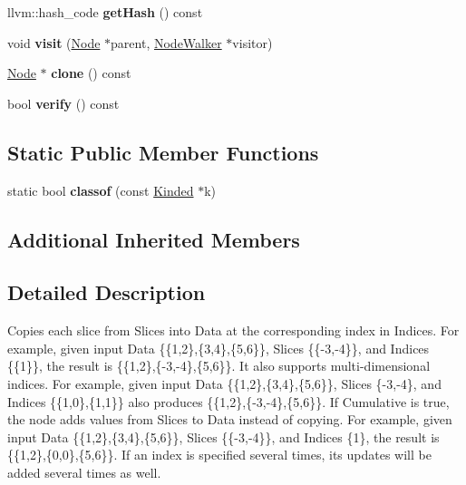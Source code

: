 \begin{DoxyCompactItemize}
\mbox{\label{classglow_1_1_scatter_data_node_a3f280cf9ec3d65c3fc680019aada2f54}} 
llvm\+::hash\+\_\+code {\bfseries get\+Hash} () const
\item 
\mbox{\label{classglow_1_1_scatter_data_node_afff14ebe54ce31d4155625d6c8e957dc}} 
void {\bfseries visit} (\hyperlink{classglow_1_1_node}{Node} $\ast$parent, \hyperlink{classglow_1_1_node_walker}{Node\+Walker} $\ast$visitor)
\item 
\mbox{\label{classglow_1_1_scatter_data_node_aff8761c16e5e69887ce9468ad8a1311f}} 
\hyperlink{classglow_1_1_node}{Node} $\ast$ {\bfseries clone} () const
\item 
\mbox{\label{classglow_1_1_scatter_data_node_a83de3d02d1f79bd9dba936229c31d571}} 
bool {\bfseries verify} () const
\end{DoxyCompactItemize}
\subsection*{Static Public Member Functions}
\begin{DoxyCompactItemize}
\item 
\mbox{\label{classglow_1_1_scatter_data_node_a564e0a5bd8f78aea83460a2a53962c35}} 
static bool {\bfseries classof} (const \hyperlink{classglow_1_1_kinded}{Kinded} $\ast$k)
\end{DoxyCompactItemize}
\subsection*{Additional Inherited Members}


\subsection{Detailed Description}
Copies each slice from Slices into Data at the corresponding index in Indices. For example, given input Data \{\{1,2\},\{3,4\},\{5,6\}\}, Slices \{\{-\/3,-\/4\}\}, and Indices \{\{1\}\}, the result is \{\{1,2\},\{-\/3,-\/4\},\{5,6\}\}. It also supports multi-\/dimensional indices. For example, given input Data \{\{1,2\},\{3,4\},\{5,6\}\}, Slices \{-\/3,-\/4\}, and Indices \{\{1,0\},\{1,1\}\} also produces \{\{1,2\},\{-\/3,-\/4\},\{5,6\}\}. If Cumulative is true, the node adds values from Slices to Data instead of copying. For example, given input Data \{\{1,2\},\{3,4\},\{5,6\}\}, Slices \{\{-\/3,-\/4\}\}, and Indices \{1\}, the result is \{\{1,2\},\{0,0\},\{5,6\}\}. If an index is specified several times, its updates will be added several times as well. 

